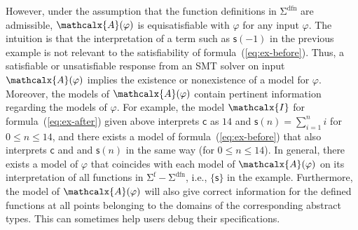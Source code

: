 \documentclass[runningheads,a4paper]{llncs}
\newcommand{\con}[1]{\mathsf{#1}}
\let\oldSigma=\Sigma
\def\Sigma{\mathrm{\oldSigma}}
\newcommand{\I}{\mathcalx{I}}
\newcommand{\conv}{\mathcalx{A}}
\newcommand{\sfuns}[1]{#1^\mathrm{f}}
\newcommand{\sfundefs}[1]{#1^\mathrm{dfn}}
\newcommand{\rem}[1]{\textcolor{red}{[#1]}}
\newcommand{\jb}[1]{\rem{#1 --jb}}
\newcommand{\ct}[1]{\rem{#1 --ct}}
\begin{document}
However, under the assumption that the function definitions in
$\sfundefs{\Sigma}$ are admissible, %
$\conv(\varphi)$ is equisatisfiable with $\varphi$ for any input $\varphi$.
The intuition is that the
interpretation of a term such as $\con{s}( -1 )$ in the previous example is not
relevant to the satisfiability of formula~(\ref{eq:ex-before}). Thus, a
satisfiable or unsatisfiable response from an SMT solver on input $\conv(
\varphi )$ implies the existence or nonexistence of a model for
$\varphi$. Moreover, the models of $\conv( \varphi )$ contain
pertinent information regarding the models of $\varphi$. For example, the model
$\I$ for formula~(\ref{eq:ex-after}) given above interprets $\con{c}$ as $14$
and $\con{s}(n) = \sum_{i=1}^n i$ for $0 \le n \le 14$,
and there exists a model of formula~(\ref{eq:ex-before}) that also interprets
$\con{c}$ and and $\con{s}(n)$ in the same way (for $0 \le n \le 14$).
In general, there exists a model of $\varphi$ that
coincides with each model of $\conv( \varphi )$ on its interpretation of all
functions in $\sfuns{\Sigma} - \sfundefs{\Sigma}$, i.e., $\{
\con{s} \}$ in the example. Furthermore, the model of $\conv( \varphi )$ will
also give correct information for the defined functions at all points belonging
to the domains of the corresponding abstract types. This can sometimes help
users debug their specifications.


\end{document}
